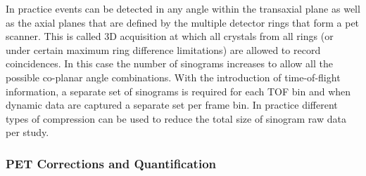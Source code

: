\begin{itemize}
In practice events can be detected in any angle within the transaxial plane as well as the axial planes that are defined by the multiple detector rings that form a \gls{pet} scanner. This is called 3D acquisition at which all crystals from all rings (or under certain maximum ring difference limitations) are allowed to record coincidences. In this case the number of sinograms increases to allow all the possible co-planar angle combinations. 
With the introduction of time-of-flight information, a separate set of sinograms is required for each TOF bin and when dynamic data are captured a separate set per frame bin. 
In practice different types of compression can be used to reduce the total size of sinogram raw data per study.

\end{itemize}

\subsubsection{PET Corrections and Quantification}

